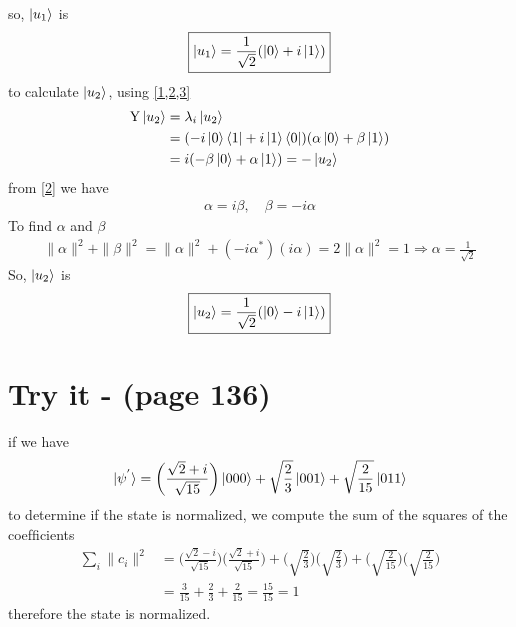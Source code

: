 \documentclass{article}
\begin{document}
so, $\ket{u_{1}}$ is
\begin{align*}
    \boxed{\ket{u_{1}} = \frac{1}{\sqrt{2}}(\ket{0} + i\ket{1})}
\end{align*}
to calculate $\ket{u_2}$, using \cref{1,2,3}
\begin{align*}
   \text{Y} \ket{u_2} &= \lambda_i \ket{u_2} \\
   &=(-i\ket{0}\bra{1} + i\ket{1}\bra{0})(\alpha\ket{0}+\beta\ket{1}) \\&
   = i(-\beta\ket{0}+\alpha\ket{1}) = -\ket{u_2}
\end{align*}
from \ref{2} we have
\begin{align*}
    \alpha = i\beta, \quad \beta = -i\alpha
\end{align*}
To find $\alpha$ and $\beta$
\begin{align*}
    \|\alpha\|^2 + \|\beta\|^2 = \|\alpha\|^2 + (-i\alpha^{*})(i\alpha) = 2\|\alpha\|^2 = 1 \Longrightarrow \alpha = \frac{1}{\sqrt{2}}
\end{align*}
So, $\ket{u_{2}}$ is
\begin{align*}
    \boxed{\ket{u_{2}} = \frac{1}{\sqrt{2}}(\ket{0} - i\ket{1})}
\end{align*}
\section*{Try it - (page 136)}
if we have
\begin{align*}
   \ket{\psi^{'}} = \bigg(\frac{\sqrt{2}+i}{\sqrt{15}}\bigg)\ket{000} + \sqrt{\frac{2}{3}}\ket{001} + \sqrt{\frac{2}{15}}\ket{011}
\end{align*}
to determine if the state is normalized, we compute the sum of the squares of the coefﬁcients
\begin{align*}
   \sum_i \|c_i\|^2 &= \bigg(\frac{\sqrt{2}-i}{\sqrt{15}}\bigg)\bigg(\frac{\sqrt{2}+i}{\sqrt{15}}\bigg) + \bigg(\sqrt{\frac{2}{3}}\bigg)\bigg(\sqrt{\frac{2}{3}}\bigg) + \bigg(\sqrt{\frac{2}{15}}\bigg)\bigg(\sqrt{\frac{2}{15}}\bigg)\\
   &= \frac{3}{15} + \frac{2}{3} + \frac{2}{15} = \frac{15}{15} = 1
\end{align*}
therefore the state is normalized.
\end{document}
